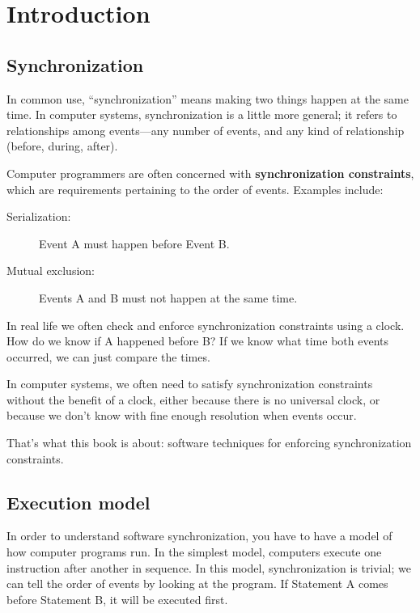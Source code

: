 \documentclass{book}
\begin{document}
\setlength{\cftchapindent}{0px}
\setlength{\cftsecindent}{5px}
\setlength{\cftsubsecindent}{10px}

\tableofcontents


\mainmatter


\chapter{Introduction}

\section{Synchronization}
\label{synch}

In common use, ``synchronization'' means making two things happen at the same time.  In computer systems, synchronization is a little more general; it refers to relationships among events---any number of events, and any kind of relationship (before, during, after).

Computer programmers are often concerned with {\bf synchronization constraints}, which are requirements pertaining to the order of events.  Examples include:

\begin{description}
    \item[Serialization:] Event A must happen before Event B.
    \item[Mutual exclusion:] Events A and B must not happen at the same time.
\end{description}

In real life we often check and enforce synchronization constraints using a clock.  How do we know if A happened before B?  If we know what time both events occurred, we can just compare the times.

In computer systems, we often need to satisfy synchronization constraints without the benefit of a clock, either because there is no universal clock, or because we don't know with fine enough resolution when events occur.

That's what this book is about: software techniques for enforcing synchronization constraints.


\section {Execution model}

In order to understand software synchronization, you have to
have a model of how computer programs run.  In the simplest
model, computers execute one instruction after another in
sequence.  In this model, synchronization is trivial; we can
tell the order of events by looking at the program.  If Statement
A comes before Statement B, it will be executed first.
\end{document}
